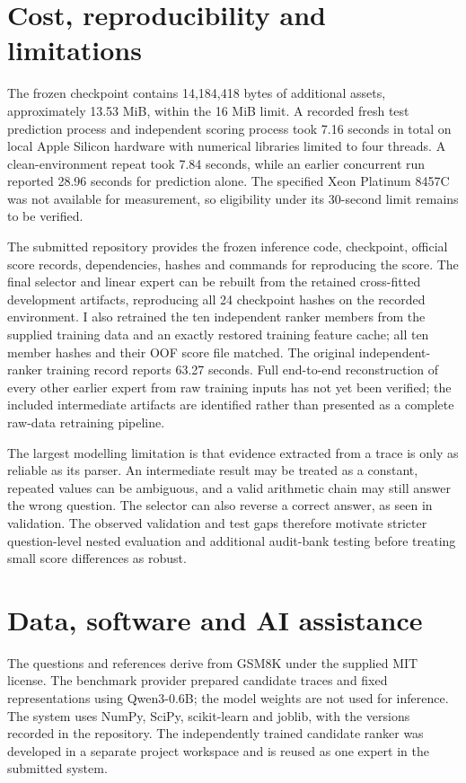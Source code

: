 \documentclass[10pt]{article}
\begin{document}
\section{Cost, reproducibility and limitations}
The frozen checkpoint contains 14,184,418 bytes of additional assets, approximately 13.53 MiB, within the 16 MiB limit. A recorded fresh test prediction process and independent scoring process took 7.16 seconds in total on local Apple Silicon hardware with numerical libraries limited to four threads. A clean-environment repeat took 7.84 seconds, while an earlier concurrent run reported 28.96 seconds for prediction alone. The specified Xeon Platinum 8457C was not available for measurement, so eligibility under its 30-second limit remains to be verified.

The submitted repository provides the frozen inference code, checkpoint, official score records, dependencies, hashes and commands for reproducing the score. The final selector and linear expert can be rebuilt from the retained cross-fitted development artifacts, reproducing all 24 checkpoint hashes on the recorded environment. I also retrained the ten independent ranker members from the supplied training data and an exactly restored training feature cache; all ten member hashes and their OOF score file matched. The original independent-ranker training record reports 63.27 seconds. Full end-to-end reconstruction of every other earlier expert from raw training inputs has not yet been verified; the included intermediate artifacts are identified rather than presented as a complete raw-data retraining pipeline.

The largest modelling limitation is that evidence extracted from a trace is only as reliable as its parser. An intermediate result may be treated as a constant, repeated values can be ambiguous, and a valid arithmetic chain may still answer the wrong question. The selector can also reverse a correct answer, as seen in validation. The observed validation and test gaps therefore motivate stricter question-level nested evaluation and additional audit-bank testing before treating small score differences as robust.
\section{Data, software and AI assistance}
The questions and references derive from GSM8K under the supplied MIT license. The benchmark provider prepared candidate traces and fixed representations using Qwen3-0.6B; the model weights are not used for inference. The system uses NumPy, SciPy, scikit-learn and joblib, with the versions recorded in the repository. The independently trained candidate ranker was developed in a separate project workspace and is reused as one expert in the submitted system.
\end{document}
